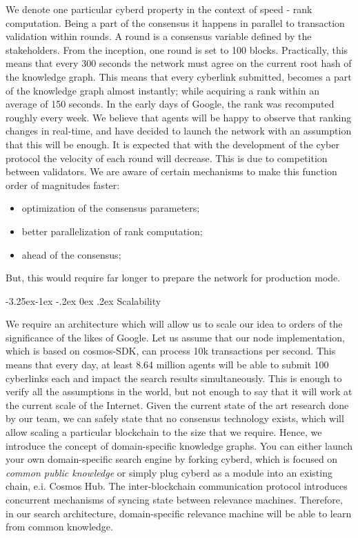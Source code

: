 \documentclass[8pt,oneside]{amsart}
\makeatletter
\newcommand{\linkred}[2]{\href{#1}{\color{red}{#2}}}
\renewcommand\subsection{\@startsection{subsection}{2}{\z@}%
                                     {-3.25ex\@plus -1ex \@minus -.2ex}%
                                     {0ex \@plus .2ex}%
                                     {\play\Large}}%
\newcommand{\titleSection}[1]{\subsection{#1}}
\newcommand{\code}[1]{{\PlayBold #1}}
\makeatother
\begin{document}
\begin{Abstract}
We denote one particular cyberd property in the context of speed - rank computation. Being a part of the consensus it happens in parallel to transaction validation within rounds. A round is a consensus variable defined by the stakeholders. From the inception, one round is set to 100 blocks. Practically, this means that every 300 seconds the network must agree on the current root hash of the knowledge graph. This means that every cyberlink submitted, becomes a part of the knowledge graph almost instantly; while acquiring a rank within an average of 150 seconds. In the early days of Google, the rank was recomputed roughly every week. We believe that agents will be happy to observe that ranking changes in real-time, and have decided to launch the network with an assumption that this will be enough. It is expected that with the development of the cyber protocol the velocity of each round will decrease. This is due to competition between validators. We are aware of certain mechanisms to make this function order of magnitudes faster:
\begin{itemize}
\item optimization of the consensus parameters;
\item better parallelization of rank computation;
\item \linkred{https://medium.com/solana-labs/proof-of-history-a-clock-for-blockchain-cf47a61a9274}{a better clock} ahead of the consensus;
\end{itemize}

But, this would require far longer to prepare the network for production mode.

\titleSection{Scalability}\label{Scalability}

We require an architecture which will allow us to scale our idea to orders of the significance of the likes of Google. Let us assume that our node implementation, which is based on \code{cosmos-SDK}, can process 10k transactions per second. This means that every day, at least 8.64 million agents will be able to submit 100 cyberlinks each and impact the search results simultaneously. This is enough to verify all the assumptions in the world, but not enough to say that it will work at the current scale of the Internet. Given the current state of the art research done by our team, we can safely state that no consensus technology exists, which will allow scaling a particular blockchain to the size that we require. Hence, we introduce the concept of domain-specific knowledge graphs. You can either launch your own domain-specific search engine by forking cyberd, which is focused on \textit{common public knowledge} or simply plug cyberd as a module into an existing chain, e.i. Cosmos Hub. The inter-blockchain communication protocol introduces concurrent mechanisms of syncing state between relevance machines. Therefore, in our search architecture, domain-specific relevance machine will be able to learn from common knowledge.


\end{Abstract}
\end{document}
